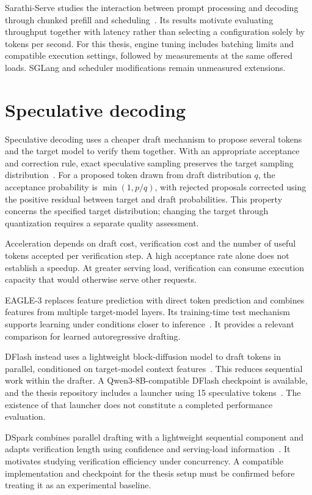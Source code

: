 Sarathi-Serve studies the interaction between prompt processing and decoding through chunked prefill and scheduling~\cite{sarathi}. Its results motivate evaluating throughput together with latency rather than selecting a configuration solely by tokens per second. For this thesis, engine tuning includes batching limits and compatible execution settings, followed by measurements at the same offered loads. SGLang and scheduler modifications remain unmeasured extensions.

\section{Speculative decoding}
Speculative decoding uses a cheaper draft mechanism to propose several tokens and the target model to verify them together. With an appropriate acceptance and correction rule, exact speculative sampling preserves the target sampling distribution~\cite{specdec}. For a proposed token drawn from draft distribution $q$, the acceptance probability is $\min(1,p/q)$, with rejected proposals corrected using the positive residual between target and draft probabilities. This property concerns the specified target distribution; changing the target through quantization requires a separate quality assessment.

Acceleration depends on draft cost, verification cost and the number of useful tokens accepted per verification step. A high acceptance rate alone does not establish a speedup. At greater serving load, verification can consume execution capacity that would otherwise serve other requests.

EAGLE-3 replaces feature prediction with direct token prediction and combines features from multiple target-model layers. Its training-time test mechanism supports learning under conditions closer to inference~\cite{eagle3}. It provides a relevant comparison for learned autoregressive drafting.

DFlash instead uses a lightweight block-diffusion model to draft tokens in parallel, conditioned on target-model context features~\cite{dflash}. This reduces sequential work within the drafter. A Qwen3-8B-compatible DFlash checkpoint is available, and the thesis repository includes a launcher using 15 speculative tokens~\cite{dflashmodel,procedure}. The existence of that launcher does not constitute a completed performance evaluation.

DSpark combines parallel drafting with a lightweight sequential component and adapts verification length using confidence and serving-load information~\cite{dspark}. It motivates studying verification efficiency under concurrency. A compatible implementation and checkpoint for the thesis setup must be confirmed before treating it as an experimental baseline.


